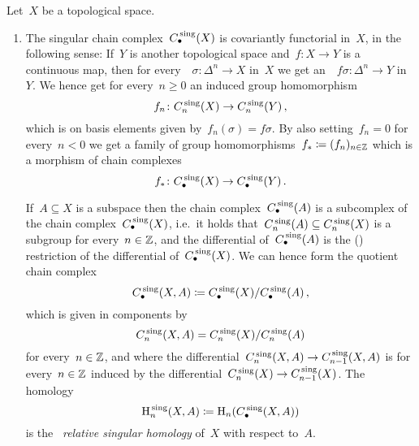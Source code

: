 \begin{example}
  Let~$X$ be a topological space.
  \begin{enumerate}
    \item
      The singular chain complex~$C_\bullet^{\,\mathrm{sing}}(X)$ is covariantly functorial in~$X$, in the following sense:
      If~$Y$ is another topological space and~$f \colon X \to Y$ is a continuous map, then for every~{}~$\sigma \colon \Delta^n \to X$ in~$X$ we get an~{}~$f \sigma \colon \Delta^n \to Y$ in~$Y$.
      We hence get for every~$n \geq 0$ an induced group homomorphism
      \[
        f_n
        \colon
        C^{\,\mathrm{sing}}_n(X)
        \to
        C^{\,\mathrm{sing}}_n(Y)  \,,
      \]
      which is on basis elements given by~$f_n(\sigma) = f \sigma$.
      By also setting~$f_n = 0$ for every~$n < 0$ we get a family of group homomorphisms~$f_* \coloneqq (f_n)_{n \in \mathbb{Z}}$ which is a morphism of chain complexes
      \[
        f_*
        \colon
        C_\bullet^{\,\mathrm{sing}}(X)
        \to
        C_\bullet^{\,\mathrm{sing}}(Y)
        \,.
      \]
      
      If~$A \subseteq X$ is a subspace then the chain complex~$C_\bullet^{\,\mathrm{sing}}(A)$ is a subcomplex of the chain complex~$C_\bullet^{\,\mathrm{sing}}(X)$, i.e.\ it holds that~$C^{\,\mathrm{sing}}_n(A) \subseteq C^{\,\mathrm{sing}}_n(X)$ is a subgroup for every~$n \in \mathbb{Z}$, and the differential of~$C_\bullet^{\,\mathrm{sing}}(A)$ is the ({\welldef}) restriction of the differential of~$C_\bullet^{\,\mathrm{sing}}(X)$.
      We can hence form the quotient chain complex
      \[
                  C_\bullet^{\,\mathrm{sing}}(X,A)
        \coloneqq  C_\bullet^{\,\mathrm{sing}}(X)/C_\bullet^{\,\mathrm{sing}}(A) \,,
      \]
      which is given in components by
      \[
          C^{\,\mathrm{sing}}_n(X,A)
        = C^{\,\mathrm{sing}}_n(X)/C^{\,\mathrm{sing}}_n(A)
      \]
      for every~$n \in \mathbb{Z}$, and where the differential~$C^{\,\mathrm{sing}}_n(X,A) \to C^{\,\mathrm{sing}}_{n-1}(X,A)$ is for every~$n \in \mathbb{Z}$ induced by the differential~$C^{\,\mathrm{sing}}_n(X) \to C^{\,\mathrm{sing}}_{n-1}(X)$.
      The homology
      \[
                  \operatorname{H}^{\,\mathrm{sing}}_n(X,A)
        \coloneqq  \operatorname{H}_n( C_\bullet^{\,\mathrm{sing}}(X,A) )
      \]
      is the~ \emph{relative singular homology} of~$X$ with respect to~$A$.
      

\end{enumerate}
\end{example}
